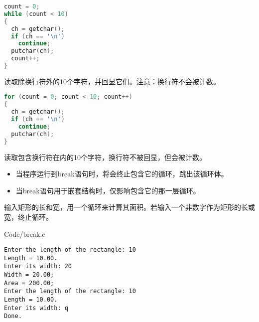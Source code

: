 \begin{frame}[fragile]
\begin{lstlisting}[language=c,frame=single]
count = 0;
while (count < 10)
{
  ch = getchar();
  if (ch == '\n')
    continue;
  putchar(ch);
  count++;
}
\end{lstlisting}
读取除换行符外的10个字符，并回显它们。注意：换行符不会被计数。
\end{frame}

\begin{frame}[fragile]
\begin{lstlisting}[language=c,frame=single]
for (count = 0; count < 10; count++)
{
  ch = getchar();
  if (ch == '\n')
    continue;
  putchar(ch);
}
\end{lstlisting}
读取包含换行符在内的10个字符，换行符不被回显，但会被计数。
\end{frame}

\begin{frame}[fragile]
\begin{itemize}
\item
当程序运行到break语句时，将会终止包含它的循环，跳出该循环体。\\[0.1in]
\item
当break语句用于嵌套结构时，仅影响包含它的那一层循环。
\end{itemize}
\end{frame}

\begin{frame}[fragile]
\begin{li}
输入矩形的长和宽，用一个循环来计算其面积。若输入一个非数字作为矩形的长或宽，终止循环。
\end{li}
\end{frame}

\begin{frame}


            {Code/break.c}
\end{frame}


\begin{frame}[fragile]
\begin{lstlisting}[backgroundcolor=\color{red!10}]
Enter the length of the rectangle: 10
Length = 10.00.
Enter its width: 20
Width = 20.00;
Area = 200.00; 
Enter the length of the rectangle: 10
Length = 10.00.
Enter its width: q
Done.
\end{lstlisting}
\end{frame}

